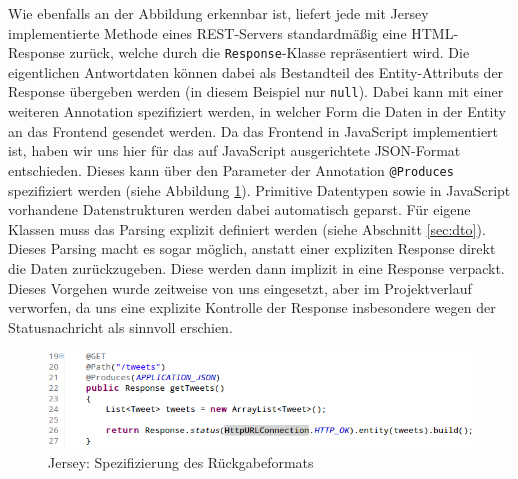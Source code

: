 Wie ebenfalls an der Abbildung erkennbar ist, liefert jede mit Jersey implementierte Methode eines REST-Servers standardmäßig eine HTML-Response zurück, welche durch die \texttt{Response}-Klasse repräsentiert wird. Die eigentlichen Antwortdaten können dabei als Bestandteil des Entity-Attributs der Response übergeben werden (in diesem Beispiel nur \texttt{null}). Dabei kann mit einer weiteren Annotation spezifiziert werden, in welcher Form die Daten in der Entity an das Frontend gesendet werden. Da das Frontend in JavaScript implementiert ist, haben wir uns hier für das auf JavaScript ausgerichtete JSON-Format entschieden. Dieses kann über den Parameter der Annotation \texttt{@Produces} spezifiziert werden (siehe Abbildung \ref{jerseyproduces}). Primitive Datentypen sowie in JavaScript vorhandene Datenstrukturen werden dabei automatisch geparst. Für eigene Klassen muss das Parsing explizit definiert werden (siehe Abschnitt \ref{sec:dto}). Dieses Parsing macht es sogar möglich, anstatt einer expliziten Response direkt die Daten zurückzugeben. Diese werden dann implizit in eine Response verpackt. Dieses Vorgehen wurde zeitweise von uns eingesetzt, aber im Projektverlauf verworfen, da uns eine explizite Kontrolle der Response insbesondere wegen der Statusnachricht als sinnvoll erschien.

\begin{figure}[h]
\centering
\includegraphics[scale=0.6]{Bilder/REST/JerseyProduces.png}
\caption{Jersey: Spezifizierung des Rückgabeformats}
\label{jerseyproduces}
\end{figure}

